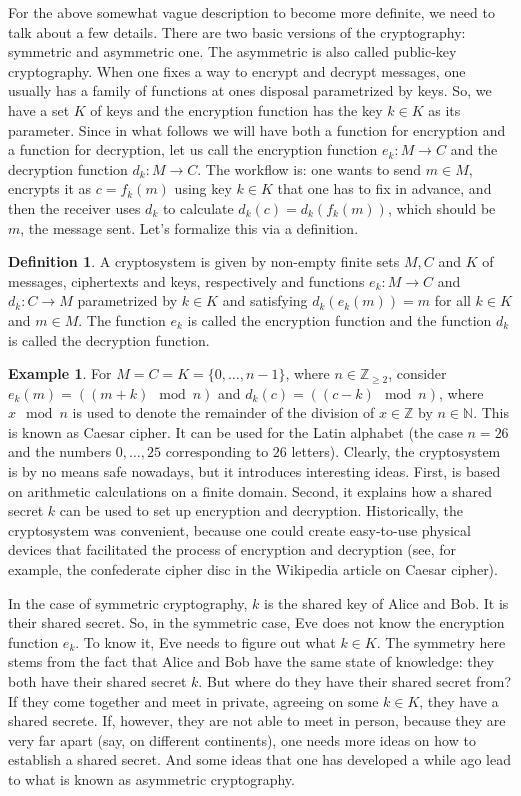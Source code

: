 \documentclass[11pt]{article}
\newcommand{\Z}{\mathbb{Z}}
\newcommand{\N}{\mathbb{N}}
\theoremstyle{plain}
\theoremstyle{definition}
\newtheorem{defn}[theorem]{Definition}
\newtheorem{example}[theorem]{Example}
\begin{document}
For the above somewhat vague description to become more definite, we need to talk about a few details. There are two basic versions of the cryptography: symmetric and asymmetric one. The asymmetric is also called public-key cryptography. When one fixes a way to encrypt and decrypt messages, one usually has a family of functions at ones disposal parametrized by keys. So, we have a set $K$ of keys and the encryption function has the key $k \in K$ as its parameter. Since in what follows we will have both a function for encryption and a function for decryption, let us call the encryption function $e_k : M \to C $ and the decryption function $d_k : M \to C$. The workflow is: one wants to send $m \in M$, encrypts it as $c = f_k(m)$ using key $k \in K$ that one has to fix in advance, and then the receiver uses $d_k$ to calculate $d_k(c) = d_k(f_k(m))$, which should be $m$, the message sent. Let's  formalize this via a definition. 

\begin{defn} A cryptosystem is given by non-empty finite sets $M, C$ and $K$ of messages, ciphertexts and keys, respectively and functions $e_k : M \to C$ and $d_k : C \to M$ parametrized by $k \in K$ and satisfying $d_k(e_k(m)) = m$ for all $k \in K$ and $m \in M$. The function $e_k$ is called the encryption function and the function $d_k$ is called the decryption function. 
\end{defn} 

\begin{example} 
	For $M = C = K =   \{0,\ldots,n-1\}$, where $n \in \Z_{\ge 2}$, consider $e_k(m) = ((m+k) \mod n)$ and $d_k(c) = ((c-k) \mod n)$, where $x \mod n$ is used to denote the remainder of the division of $x \in \Z$ by $n \in \N$. This is known as Caesar cipher. It can be used for the Latin alphabet (the case $n=26$ and the numbers $0,\ldots,25$ corresponding to $26$ letters). Clearly, the cryptosystem is by no means safe nowadays, but it introduces interesting ideas. First, is based on arithmetic calculations on a finite domain. Second, it explains how a shared secret $k$ can be used to set up encryption and decryption. Historically, the cryptosystem was convenient, because one could create easy-to-use physical devices that facilitated the process of encryption and decryption (see, for example, the confederate cipher disc in the Wikipedia article on Caesar cipher). 
\end{example} 


In the case of symmetric cryptography, $k$ is the shared key of Alice and Bob. It is their shared secret. So, in the symmetric case, Eve does not know the encryption function $e_k$. To know it, Eve needs to figure out what $k \in K$. The symmetry here stems from the fact that Alice and Bob have the same state of knowledge: they both have their shared secret $k$. But where do they have their shared secret from? If they come together and meet in private, agreeing on some $k \in K$, they have a shared secrete. If, however, they are not able to meet in person, because they are very far apart (say, on different continents), one needs more ideas on how to establish a shared secret. And some ideas that one has developed a while ago lead to what is known as asymmetric cryptography. 
\end{document}
